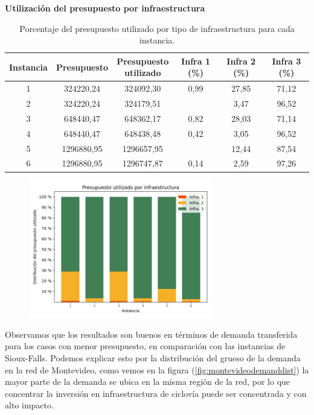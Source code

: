 \documentclass{article}
\begin{document}
  \begin{table}[h!]
    \centering
    \caption*{{\bf Utilización del presupuesto por infraestructura}}
    \begin{tabular}{cccccc}
      \toprule
        Instancia & Presupuesto & \shortstack{Presupuesto \\ utilizado} & Infra 1 (\%) & Infra 2 (\%) & Infra 3 (\%) \\
      \midrule
        1 & 324220,24 & 324092,30 & 0,99 & 27,85 & 71,12 \\
        2 & 324220,24 & 324179,51 &  & 3,47 & 96,52 \\
        3 & 648440,47 & 648362,17 & 0,82 & 28,03 & 71,14 \\
        4 & 648440,47 & 648438,48 & 0,42 & 3,05 & 96,52 \\
        5 & 1296880,95 & 1296657,95 &  & 12,44 & 87,54 \\
        6 & 1296880,95 & 1296747,87 & 0,14 & 2,59 & 97,26 \\
      \bottomrule
    \end{tabular}
      \caption{Porcentaje del presupuesto utilizado por tipo de infraestructura para cada instancia.}\label{table:montevideobudgetusage}
  \end{table}

  \begin{figure}[h!]
    \centering
    \includegraphics[width=8cm]{../resources/montevideo_budget_usage_by_infra.png}
      \caption{}
    \label{fig:montevideobudgetusage}
  \end{figure}

  Observamos que los resultados son buenos en términos de demanda transferida para los casos con menor presupuesto, en comparación con las instancias de Sioux-Falls. Podemos explicar esto por la distribución del grueso de la demanda en la red de Montevideo, como vemos en la figura (\ref{fig:montevideodemanddist}) la mayor parte de la demanda se ubica en la misma región de la red, por lo que concentrar la inversión en infraestructura de ciclovía puede ser concentrada y con alto impacto.
\end{document}
